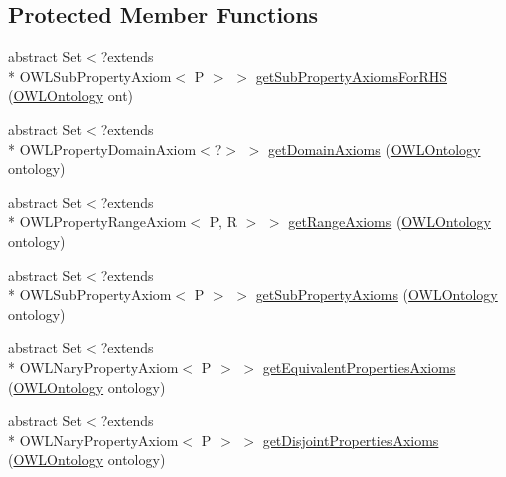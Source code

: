 \subsection*{Protected Member Functions}
\begin{DoxyCompactItemize}
\item 
abstract Set$<$?extends \\*
O\-W\-L\-Sub\-Property\-Axiom$<$ P $>$ $>$ \hyperlink{classuk_1_1ac_1_1manchester_1_1cs_1_1owl_1_1owlapi_1_1_o_w_l_property_expression_impl_3_01_r_01e672e5abee4203a562fc61711ec3f6ded_a6f4ff5e950d5a6176bab89cc714a3ee9}{get\-Sub\-Property\-Axioms\-For\-R\-H\-S} (\hyperlink{interfaceorg_1_1semanticweb_1_1owlapi_1_1model_1_1_o_w_l_ontology}{O\-W\-L\-Ontology} ont)
\item 
abstract Set$<$?extends \\*
O\-W\-L\-Property\-Domain\-Axiom$<$?$>$ $>$ \hyperlink{classuk_1_1ac_1_1manchester_1_1cs_1_1owl_1_1owlapi_1_1_o_w_l_property_expression_impl_3_01_r_01e672e5abee4203a562fc61711ec3f6ded_a579bc46e3a828ddf71682b654ce5e1b6}{get\-Domain\-Axioms} (\hyperlink{interfaceorg_1_1semanticweb_1_1owlapi_1_1model_1_1_o_w_l_ontology}{O\-W\-L\-Ontology} ontology)
\item 
abstract Set$<$?extends \\*
O\-W\-L\-Property\-Range\-Axiom$<$ P, R $>$ $>$ \hyperlink{classuk_1_1ac_1_1manchester_1_1cs_1_1owl_1_1owlapi_1_1_o_w_l_property_expression_impl_3_01_r_01e672e5abee4203a562fc61711ec3f6ded_a17303edf9df6f4c6aaba0fb66ba18d79}{get\-Range\-Axioms} (\hyperlink{interfaceorg_1_1semanticweb_1_1owlapi_1_1model_1_1_o_w_l_ontology}{O\-W\-L\-Ontology} ontology)
\item 
abstract Set$<$?extends \\*
O\-W\-L\-Sub\-Property\-Axiom$<$ P $>$ $>$ \hyperlink{classuk_1_1ac_1_1manchester_1_1cs_1_1owl_1_1owlapi_1_1_o_w_l_property_expression_impl_3_01_r_01e672e5abee4203a562fc61711ec3f6ded_a4c903066a12abdffd326c0aeb19705df}{get\-Sub\-Property\-Axioms} (\hyperlink{interfaceorg_1_1semanticweb_1_1owlapi_1_1model_1_1_o_w_l_ontology}{O\-W\-L\-Ontology} ontology)
\item 
abstract Set$<$?extends \\*
O\-W\-L\-Nary\-Property\-Axiom$<$ P $>$ $>$ \hyperlink{classuk_1_1ac_1_1manchester_1_1cs_1_1owl_1_1owlapi_1_1_o_w_l_property_expression_impl_3_01_r_01e672e5abee4203a562fc61711ec3f6ded_a9bac432961b676baa7bed7c74b1101d8}{get\-Equivalent\-Properties\-Axioms} (\hyperlink{interfaceorg_1_1semanticweb_1_1owlapi_1_1model_1_1_o_w_l_ontology}{O\-W\-L\-Ontology} ontology)
\item 
abstract Set$<$?extends \\*
O\-W\-L\-Nary\-Property\-Axiom$<$ P $>$ $>$ \hyperlink{classuk_1_1ac_1_1manchester_1_1cs_1_1owl_1_1owlapi_1_1_o_w_l_property_expression_impl_3_01_r_01e672e5abee4203a562fc61711ec3f6ded_af8a032f5dc3d8b6cad0b4f322e496d7e}{get\-Disjoint\-Properties\-Axioms} (\hyperlink{interfaceorg_1_1semanticweb_1_1owlapi_1_1model_1_1_o_w_l_ontology}{O\-W\-L\-Ontology} ontology)
\end{DoxyCompactItemize}

